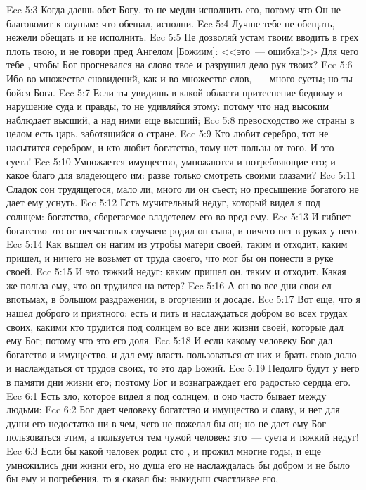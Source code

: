 \rsbpar\vs Ecc 5:3 Когда даешь обет Богу, то не медли исполнить его, потому что Он не благоволит к глупым: что обещал, исполни.
\vs Ecc 5:4 Лучше тебе не обещать, нежели обещать и не исполнить.
\vs Ecc 5:5 Не дозволяй устам твоим вводить в грех плоть твою, и не говори пред Ангелом [Божиим]: <<это~--- ошибка!>> Для чего тебе , чтобы Бог прогневался на слово твое и разрушил дело рук твоих?
\vs Ecc 5:6 Ибо во множестве сновидений, как и во множестве слов,~--- много суеты; но ты бойся Бога.
\rsbpar\vs Ecc 5:7 Если ты увидишь в какой области притеснение бедному и нарушение суда и правды, то не удивляйся этому: потому что над высоким наблюдает высший, а над ними еще высший;
\vs Ecc 5:8 превосходство же страны в целом есть царь, заботящийся о стране.
\vs Ecc 5:9 Кто любит серебро, тот не насытится серебром, и кто любит богатство, тому нет пользы от того. И это~--- суета!
\vs Ecc 5:10 Умножается имущество, умножаются и потребляющие его; и какое благо для владеющего им: разве только смотреть своими глазами?
\vs Ecc 5:11 Сладок сон трудящегося, мало ли, много ли он съест; но пресыщение богатого не дает ему уснуть.
\vs Ecc 5:12 Есть мучительный недуг, который видел я под солнцем: богатство, сберегаемое владетелем его во вред ему.
\vs Ecc 5:13 И гибнет богатство это от несчастных случаев: родил он сына, и ничего нет в руках у него.
\vs Ecc 5:14 Как вышел он нагим из утробы матери своей, таким и отходит, каким пришел, и ничего не возьмет от труда своего, что мог бы он понести в руке своей.
\vs Ecc 5:15 И это тяжкий недуг: каким пришел он, таким и отходит. Какая же польза ему, что он трудился на ветер?
\vs Ecc 5:16 А он во все дни свои ел впотьмах, в большом раздражении, в огорчении и досаде.
\rsbpar\vs Ecc 5:17 Вот еще, что я нашел доброго и приятного: есть и пить и наслаждаться добром во всех трудах своих, какими кто трудится под солнцем во все дни жизни своей, которые дал ему Бог; потому что это его доля.
\vs Ecc 5:18 И если какому человеку Бог дал богатство и имущество, и дал ему власть пользоваться от них и брать свою долю и наслаждаться от трудов своих, то это дар Божий.
\vs Ecc 5:19 Недолго будут у него в памяти дни жизни его; поэтому Бог и вознаграждает его радостью сердца его.
\vs Ecc 6:1 Есть зло, которое видел я под солнцем, и оно часто бывает между людьми:
\vs Ecc 6:2 Бог дает человеку богатство и имущество и славу, и нет для души его недостатка ни в чем, чего не пожелал бы он; но не дает ему Бог пользоваться этим, а пользуется тем чужой человек: это~--- суета и тяжкий недуг!
\vs Ecc 6:3 Если бы какой человек родил сто , и прожил многие годы, и еще умножились дни жизни его, но душа его не наслаждалась бы добром и не было бы ему и погребения, то я сказал бы: выкидыш счастливее его,
